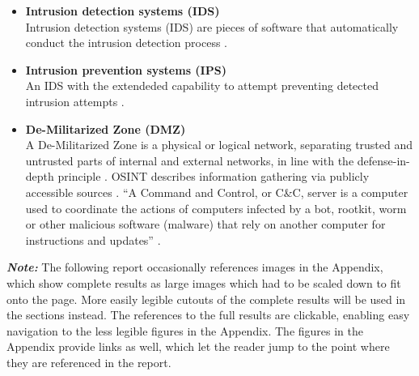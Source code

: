 \documentclass[../report.tex]{subfiles}
\begin{document}
\begin{itemize}
	\item{\textbf{Intrusion detection systems (IDS)}}\\
	Intrusion detection systems (IDS) are pieces of software that automatically conduct the intrusion detection process \autocite{scarfone2007guide}.
	\item{\textbf{Intrusion prevention systems (IPS)}}\\
	An IDS with the extendeded capability to attempt preventing detected intrusion attempts \autocite{scarfone2007guide}.
	\item{\textbf{De-Militarized Zone (DMZ)}}\\
	A De-Militarized Zone is a physical or logical network, separating trusted and untrusted parts of internal and external networks, in line with the defense-in-depth principle \autocite{8473328}.
	OSINT describes information gathering via publicly accessible sources \autocite{osint_def}.
	\enquote{A Command and Control, or C\&C, server is a computer used to coordinate the actions of computers infected by a bot, rootkit, worm or other malicious software (malware) that rely on another computer for instructions and updates} \autocite{eset:C2}.
\end{itemize}

\textbf{\textit{Note:}} The following report occasionally references images in the Appendix, which show complete results as large images which had to be scaled down to fit onto the page.  More easily legible cutouts of the complete results will be used in the sections instead. The references to the full results are clickable, enabling easy navigation to the less legible figures in the Appendix. The figures in the Appendix provide links as well, which let the reader jump to the point where they are referenced in the report.
\end{document}
